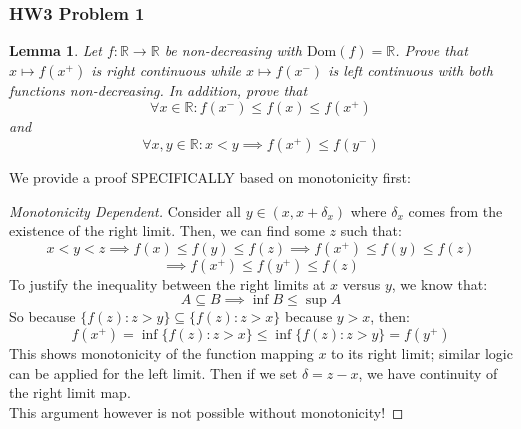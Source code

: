 \documentclass[10pt,letterpaper]{article} %
\newtheorem{lem}{Lemma}[section]
\begin{document}
\subsubsection{HW3 Problem 1}
\begin{lem}
Let $f: \mathbb{R} \xrightarrow{} \mathbb{R}$ be non-decreasing with $\text{Dom}(f) = \mathbb{R}$. Prove that $x \mapsto f(x^+)$ is right continuous while $x \mapsto f(x^-)$ is left continuous with both functions non-decreasing. In addition, prove that
\begin{equation*}
\forall x \in \mathbb{R}: f(x^-) \leqslant f(x) \leqslant f(x^+)
\end{equation*}
and
\begin{equation*}
\forall x, y \in \mathbb{R}: x < y \implies f(x^+) \leqslant f(y^-)
\end{equation*}
\end{lem}
We provide a proof SPECIFICALLY based on monotonicity first:
\begin{proof}[Monotonicity Dependent]
Consider all $y \in (x, x + \delta_{x})$ where $\delta_{x}$ comes from the existence of the right limit. Then, we can find some $z$ such that:
\begin{equation*}
x < y < z \implies f(x) \leqslant f(y) \leqslant f(z) \implies f(x^+) \leqslant f(y) \leqslant f(z)
\end{equation*}
\begin{equation*}
\implies f(x^+) \leqslant f(y^+) \leqslant f(z)
\end{equation*}
To justify the inequality between the right limits at $x$ versus $y$, we know that:
\begin{equation*}
A \subseteq B \implies \inf B \leqslant \sup A
\end{equation*}
So because $\{f(z): z > y\} \subseteq \{f(z): z > x\}$ because $y > x$, then:
\begin{equation*}
f(x^+) = \inf\{f(z): z > x\} \leqslant \inf\{f(z): z > y\} = f(y^+)
\end{equation*}
This shows monotonicity of the function mapping $x$ to its right limit; similar logic can be applied for the left limit. Then if we set $\delta = z - x$, we have continuity of the right limit map.\\

This argument however is not possible without monotonicity!
\end{proof}
\end{document}
